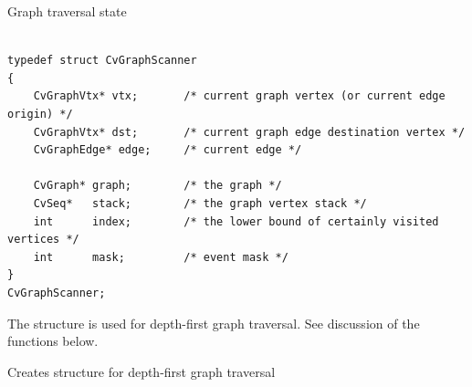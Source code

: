 \label{CvGraphScanner}

Graph traversal state

\begin{lstlisting}

typedef struct CvGraphScanner
{
    CvGraphVtx* vtx;       /* current graph vertex (or current edge origin) */
    CvGraphVtx* dst;       /* current graph edge destination vertex */
    CvGraphEdge* edge;     /* current edge */

    CvGraph* graph;        /* the graph */
    CvSeq*   stack;        /* the graph vertex stack */
    int      index;        /* the lower bound of certainly visited vertices */
    int      mask;         /* event mask */
}
CvGraphScanner;

\end{lstlisting}

The structure  is used for depth-first graph traversal. See discussion of the functions below.


\label{CreateGraphScanner}

Creates structure for depth-first graph traversal


